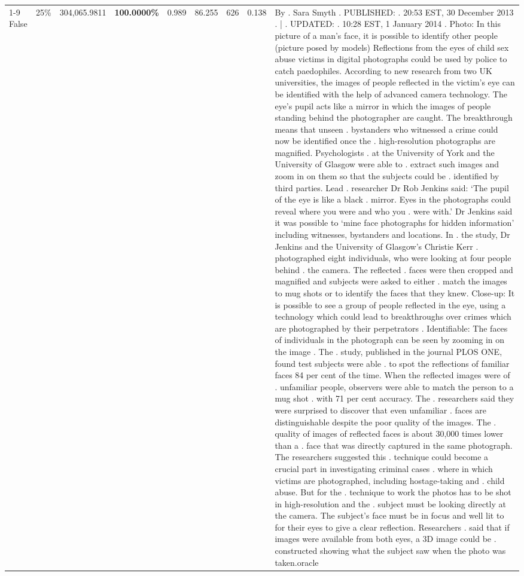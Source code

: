 \begin{table}[H]
\begin{tabular}{lllrlllll}
\cline{1-9} \cline{2-9}
False & 25\% & 304,065.9811 & \bfseries \color{red} 100.0000\% & 0.989 & 86.255 & 626 & 0.138 & By . Sara Smyth . PUBLISHED: . 20:53 EST, 30 December 2013 . | . UPDATED: . 10:28 EST, 1 January 2014 . Photo: In this picture of a man's face, it is possible to identify other people (picture posed by models) Reflections from the eyes of child sex abuse victims in digital photographs could be used by police to catch paedophiles. According to new research from two UK universities, the images of people reflected in the victim's eye can be identified with the help of advanced camera technology. The eye's pupil acts like a mirror in which the images of people standing behind the photographer are caught. The breakthrough means that unseen . bystanders who witnessed a crime could now be identified once the . high-resolution photographs are magnified. Psychologists . at the University of York and the University of Glasgow were able to . extract such images and zoom in on them so that the subjects could be . identified by third parties. Lead . researcher Dr Rob Jenkins said: ‘The pupil of the eye is like a black . mirror. Eyes in the photographs could reveal where you were and who you . were with.' Dr Jenkins said it was possible to ‘mine face photographs for hidden information' including witnesses, bystanders and locations. In . the study, Dr Jenkins and the University of Glasgow's Christie Kerr . photographed eight individuals, who were looking at four people behind . the camera. The reflected . faces were then cropped and magnified and subjects were asked to either . match the images to mug shots or to identify the faces that they knew. Close-up: It is possible to see a group of people reflected in the eye, using a technology which could lead to breakthroughs over crimes which are photographed by their perpetrators . Identifiable: The faces of individuals in the photograph can be seen by zooming in on the image . The . study, published in the journal PLOS ONE, found test subjects were able . to spot the reflections of familiar faces 84 per cent of the time. When the reflected images were of . unfamiliar people, observers were able to match the person to a mug shot . with 71 per cent accuracy. The . researchers said they were surprised to discover that even unfamiliar . faces are distinguishable despite the poor quality of the images. The . quality of images of reflected faces is about 30,000 times lower than a . face that was directly captured in the same photograph. The researchers suggested this . technique could become a crucial part in investigating criminal cases . where in which victims are photographed, including hostage-taking and . child abuse. But for the . technique to work the photos has to be shot in high-resolution and the . subject must be looking directly at the camera. The subject's face must be in focus and well lit to for their eyes to give a clear reflection. Researchers . said that if images were available from both eyes, a 3D image could be . constructed showing what the subject saw when the photo was taken.oracle \\

\end{tabular}
\end{table}
